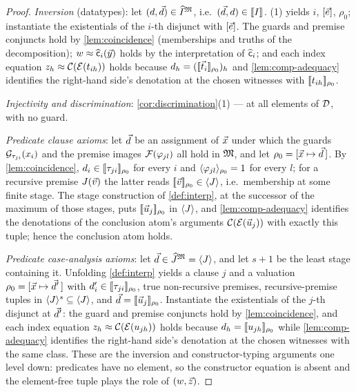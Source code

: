 \begin{proof}
\emph{Inversion} (datatypes): let $(d, \vec{d}) \in \widehat{I}^{\mathfrak{M}}$,
i.e.\ $(\vec{d}, d) \in [\![ I ]\!]_{}$.  (1)
yields $i$, $[\vec{e}]$, $\rho_0$; instantiate the existentials of
the $i$-th disjunct with $[\vec{e}]$.  The guards and premise
conjuncts hold by \cref{lem:coincidence} (memberships and truths of the
decomposition); $w \approx \widehat{\mathsf{c}}_i(\vec{y})$ holds by the
interpretation of $\widehat{\mathsf{c}}_i$; and each index equation $z_h
\approx \mathcal{C}(\mathcal{E}(t_{ih}))$ holds because $d_h =
([\![ \vec{t}_i ]\!]_{\rho_0})_h$ and \cref{lem:comp-adequacy} identifies
the right-hand side's denotation at the chosen witnesses with
$[\![ t_{ih} ]\!]_{\rho_0}$.

\emph{Injectivity and discrimination}: \cref{cor:discrimination}(1) ---
at all elements of $\mathcal{D}$, with no guard.

\emph{Predicate clause axioms}: let $\vec{d}$ be an assignment of
$\vec{x}$ under which the guards $\mathcal{G}_{\tau_{ji}}(x_i)$ and the
premise images $\mathcal{F}(\varphi_{jl})$ all hold in $\mathfrak{M}$, and let $\rho_0 =
[\vec{x} \mapsto \vec{d}\,]$.  By \cref{lem:coincidence}, $d_i \in
[\![ \tau_{ji} ]\!]_{\rho_0}$ for every $i$ and $\langle \varphi_{jl} \rangle_{\rho_0} = 1$ for every $l$; for a recursive premise $J(\vec{v})$ the
latter reads $[\![ \vec{v} ]\!]_{\rho_0} \in \langle J \rangle$, i.e.\ membership at
some finite stage.  The stage construction of \cref{def:interp}, at
the successor of the maximum of those stages, puts
$[\![ \vec{u}_j ]\!]_{\rho_0}$ in $\langle J \rangle$, and \cref{lem:comp-adequacy}
identifies the denotations of the conclusion atom's arguments
$\mathcal{C}(\mathcal{E}(\vec{u}_j))$ with exactly this tuple; hence the
conclusion atom holds.

\emph{Predicate case-analysis axioms}: let $\vec{d} \in \widehat{J}^{\mathfrak{M}}
= \langle J \rangle$, and let $s + 1$ be the least stage containing it.
Unfolding \cref{def:interp} yields a clause $j$ and a valuation
$\rho_0 = [\vec{x} \mapsto \vec{d}'\,]$ with $d'_i \in
[\![ \tau_{ji} ]\!]_{\rho_0}$, true non-recursive premises,
recursive-premise tuples in $\langle J \rangle^{s} \subseteq \langle J \rangle$, and $\vec{d}
= [\![ \vec{u}_j ]\!]_{\rho_0}$.  Instantiate the existentials of the
$j$-th disjunct at $\vec{d}'$: the guard and premise conjuncts hold by
\cref{lem:coincidence}, and each index equation $z_h \approx
\mathcal{C}(\mathcal{E}(u_{jh}))$ holds because $d_h = [\![ u_{jh} ]\!]_{\rho_0}$
while \cref{lem:comp-adequacy} identifies the right-hand side's
denotation at the chosen witnesses with the same class.  These are the
inversion and constructor-typing arguments one level down: predicates
have no element, so the constructor equation is absent and the
element-free tuple plays the role of $(w, \vec{z})$.
\end{proof}

